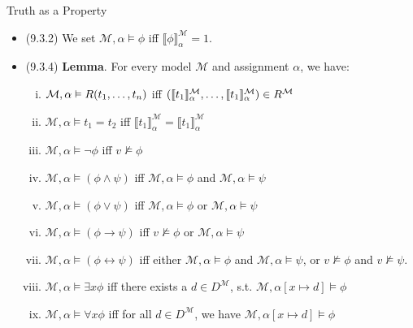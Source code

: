 \begin{frame}{Truth as a Property}

	\begin{itemize}
	
		\item (9.3.2) We set $\mathcal{M},\alpha\vDash\phi$ iff $\llbracket\phi\rrbracket^\mathcal{M}_\alpha=1$.
		
		\item (9.3.4) \textbf{Lemma}. For every model $\mathcal{M}$ and assignment $\alpha$, we have:
			
			\begin{enumerate}[(i)]
			
				\item $\mathcal{M},\alpha\vDash R(t_1,\mathellipsis, t_n)$ iff $(\llbracket t_1\rrbracket^\mathcal{M}_\alpha,\mathellipsis, \llbracket t_1\rrbracket^\mathcal{M}_\alpha)\in R^\mathcal{M}$
				
				\item $\mathcal{M},\alpha\vDash t_1=t_2$ iff $\llbracket t_1\rrbracket^\mathcal{M}_\alpha=\llbracket t_1\rrbracket^\mathcal{M}_\alpha$								
				\item $\mathcal{M},\alpha\vDash \neg\phi$ iff $v\nvDash\phi$
					
				\item $\mathcal{M},\alpha\vDash(\phi\land\psi)$ iff $\mathcal{M},\alpha\vDash\phi$ and $\mathcal{M},\alpha\vDash\psi$
				
				\item $\mathcal{M},\alpha\vDash(\phi\lor\psi)$ iff $\mathcal{M},\alpha\vDash\phi$ or $\mathcal{M},\alpha\vDash\psi$
				
				\item $\mathcal{M},\alpha\vDash(\phi\to\psi)$ iff $v\nvDash\phi$ or $\mathcal{M},\alpha\vDash\psi$
				
				\item $\mathcal{M},\alpha\vDash(\phi\leftrightarrow\psi)$ iff   either $\mathcal{M},\alpha\vDash\phi$ and $\mathcal{M},\alpha\vDash\psi$, or $v\nvDash\phi$ and $v\nvDash\psi$.				
				\item $\mathcal{M},\alpha\vDash\exists x\phi$ iff there exists a $d\in D^\mathcal{M}$, s.t.  $\mathcal{M},{\alpha[x\mapsto d]}\vDash \phi$
				
				\item $\mathcal{M},\alpha\vDash\forall x\phi$ iff for all $d\in D^\mathcal{M}$, we have $\mathcal{M},{\alpha[x\mapsto d]}\vDash \phi$
											
			\end{enumerate}
	\end{itemize}

\end{frame}

